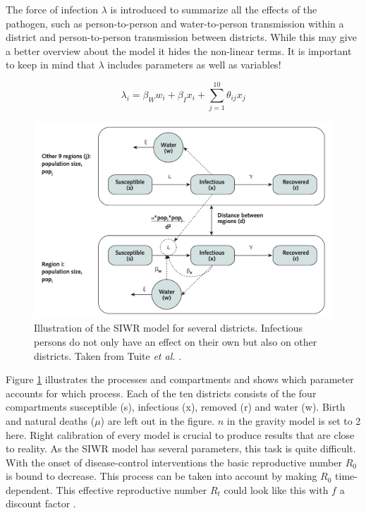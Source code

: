 \documentclass[11pt]{article}
\begin{document}
The force of infection $ \lambda $ is introduced to summarize all the effects of the pathogen, such as person-to-person and water-to-person transmission within a district and person-to-person transmission between districts. While this may give a better overview about the model it hides the non-linear terms. It is important to keep in mind that $ \lambda $ includes parameters as well as variables! 


\begin{equation}

\lambda_{i}=\beta_{W}w_{i}+\beta_{I}x_{i}+\sum_{j=1}^{10}\theta_{ij}x_{j}

\end{equation}


\begin{figure}

\includegraphics[scale=.7]{Bilder/figure_model_haiti.png}
\caption{Illustration of the SIWR model for several districts. Infectious persons do not only have an effect on their own but also on other districts. Taken from Tuite \textit{et al.} \cite{tuite:2011}.}
\label{pic:model_departments}
\end{figure}



Figure \ref{pic:model_departments} illustrates the processes and compartments and shows which parameter accounts for which process. Each of the ten districts consists of the four compartments susceptible (s), infectious (x), removed (r) and water (w). Birth and natural deaths ($ \mu $) are left out in the figure. $ n $ in the gravity model is set to 2 here. Right calibration of every model is crucial to produce results that are close to reality. As the SIWR model has several parameters, this task is quite difficult. With the onset of disease-control interventions the basic reproductive number $ R_{0} $ is bound to decrease. This process can be taken into account by making $ R_{0} $ time-dependent. This effective reproductive number $ R_{t} $ could look like this with $ f $ a discount factor \cite{tuite:2011}.
\end{document}
